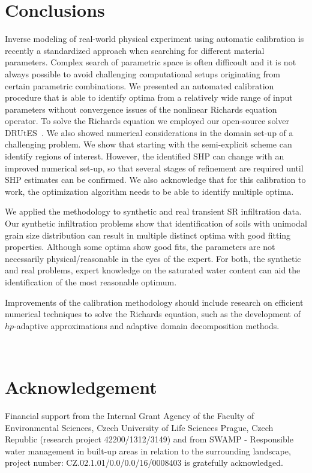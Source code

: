 \documentclass[review,times,3p,10pt]{elsarticle}
\begin{document}
\section{Conclusions}
Inverse modeling of real-world physical experiment using automatic calibration is recently a standardized approach when searching for different material parameters. Complex search of parametric space is often difficoult and it is not always possible to avoid challenging computational setups originating from certain parametric combinations. 
We presented an automated calibration procedure that is able to identify optima from a relatively wide range of input parameters without convergence issues of the nonlinear Richards equation operator.  To solve the Richards equation we employed our open-source solver DRUtES~\citep{drutes}. We also showed numerical considerations in the domain set-up of a challenging problem. We show that starting with the semi-explicit scheme can identify regions of interest. {However, the identified SHP can change  with an improved numerical set-up, so that several stages of refinement are required until SHP estimates can be confirmed.} We also acknowledge that for this calibration to work, the optimization algorithm needs to be able to identify multiple optima. 

We applied the methodology to synthetic and real transient SR infiltration data. Our synthetic infiltration problems show that identification of soils with unimodal grain size distribution can result in multiple distinct optima with good fitting properties. Although some optima show good fits, the parameters are not necessarily physical/reasonable in the eyes of the expert. For both, the synthetic and real problems, expert knowledge on the saturated water content can aid the identification of the most reasonable optimum. 

Improvements of the calibration methodology should include research on efficient numerical techniques to solve the Richards equation, such as the development of $hp$-adaptive approximations and adaptive domain decomposition  methods.




\bigskip
~
\bigskip

\section{Acknowledgement}

Financial support from the Internal Grant Agency of the Faculty of Environmental Sciences, Czech University of Life Sciences Prague, Czech Republic (research project 42200/1312/3149) and from 
SWAMP - Responsible water management in built-up areas in relation to
the surrounding landscape, project number: CZ.02.1.01/0.0/0.0/16/0008403
is gratefully acknowledged.
\end{document}
